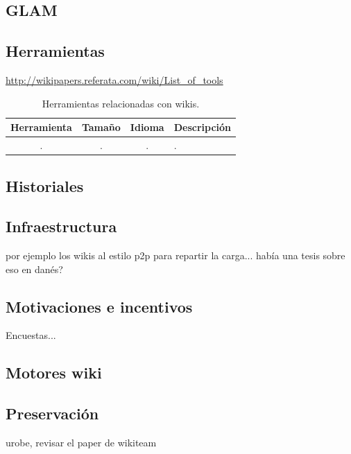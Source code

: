 \documentclass[11pt,onecolumn]{article}
\begin{document}
\subsection{GLAM}


\subsection{Herramientas}

\href{http://wikipapers.referata.com/wiki/List_of_tools}{http://wikipapers.referata.com/wiki/List\_of\_tools}

\begin{table}
\centering
\begin{tabular}{| c | c | c | l |}
\hline
\textbf{Herramienta} & \textbf{Tamaño} & \textbf{Idioma} & \textbf{Descripción} \\
\hline
. & . & . & . \\

\hline
\end{tabular}
\caption{Herramientas relacionadas con wikis.}
\label{tab:toolstable}
\end{table}

\subsection{Historiales}

\subsection{Infraestructura}

por ejemplo los wikis al estilo p2p para repartir la carga... había una tesis sobre eso en danés?


\subsection{Motivaciones e incentivos}


Encuestas...

\subsection{Motores wiki}


\subsection{Preservación}

urobe, revisar el paper de wikiteam
\end{document}
